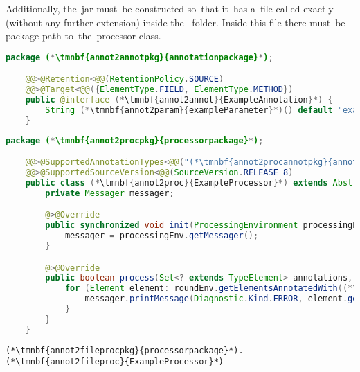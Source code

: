 Additionally, the~jar must~be constructed so~that it~has a~file called exactly  (without any further extension) inside the~ folder.
Inside this file there must~be package path to~the~processor class.
\newpage

\example
\begin{lstlisting}[language=Java, title={Annotation processed during compilation, included in~compiled code, applicable to~fields and~methods}]
    package (*\tmnbf{annot2annotpkg}{annotationpackage}*);

    @@>@Retention<@@(RetentionPolicy.SOURCE)
    @@>@Target<@@({ElementType.FIELD, ElementType.METHOD})
    public @interface (*\tmnbf{annot2annot}{ExampleAnnotation}*) {
        String (*\tmnbf{annot2param}{exampleParameter}*)() default "example default value";
    }
\end{lstlisting}
\begin{lstlisting}[language=Java, title={Annotation processor, working from Java~8, failing when annotated element is encountered}]
    package (*\tmnbf{annot2procpkg}{processorpackage}*);

    @@>@SupportedAnnotationTypes<@@("(*\tmnbf{annot2procannotpkg}{annotationpackage}[ForestGreen]*).(*\tmnbf{annot2procannot1}{ExampleAnnotation}[ForestGreen]*)")
    @@>@SupportedSourceVersion<@@(SourceVersion.RELEASE_8)
    public class (*\tmnbf{annot2proc}{ExampleProcessor}*) extends AbstractProcessor {
        private Messager messager;

        @>@Override
        public synchronized void init(ProcessingEnvironment processingEnv) {
            messager = processingEnv.getMessager();
        }

        @>@Override
        public boolean process(Set<? extends TypeElement> annotations, RoundEnvironment roundEnv) {
            for (Element element: roundEnv.getElementsAnnotatedWith((*\tmnbf{annot2procannot2}{ExampleAnnotation}*).class)) {
                messager.printMessage(Diagnostic.Kind.ERROR, element.getAnnotation((*\tmnbf{annot2procannot3}{ExampleAnnotation}*).class). (*\tmnbf{annot2procparam}{exampleParameter}*)(), element);
            }
        }
    }
\end{lstlisting}
\begin{lstlisting}[title={The file \textit{javax.annotation.processing.Processor}}]
    (*\tmnbf{annot2fileprocpkg}{processorpackage}*).(*\tmnbf{annot2fileproc}{ExampleProcessor}*)
\end{lstlisting}
\newpage

